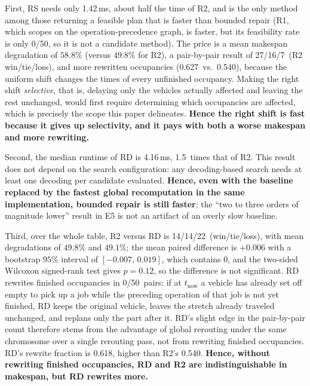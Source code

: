 \documentclass[manuscript,screen,review]{acmart}
\newcommand{\NPairs}{50}
\newcommand{\FeasRone}{0/\NPairs}            %
\newcommand{\MsShift}{1.42}          %
\newcommand{\MsRedecode}{4.16}       %
\newcommand{\RedecodeRatio}{1.5}     %
\newcommand{\RedecodeBad}{0/\NPairs}
\newcommand{\WinVsShift}{27/16/7}    %
\newcommand{\WinVsRedecode}{14/14/22}
\newcommand{\ResFracCheapRtwo}{0.540}
\newcommand{\ResFracShift}{0.627}
\newcommand{\ResFracRedecode}{0.618}
\begin{document}
First, RS needs only \MsShift\,ms, about half the time of R2, and is the only method among those returning a feasible plan that is faster than bounded repair
(R1, which scopes on the operation-precedence graph, is faster, but its feasibility rate is only \FeasRone, so it is not a candidate method).
The price is a mean makespan degradation of \(58.8\%\) (versus \(49.8\%\) for R2), a pair-by-pair result of \WinVsShift\ (R2 win/tie/loss), and more rewritten occupancies
(\ResFracShift\ vs.\ \ResFracCheapRtwo), because the uniform shift changes the times of every unfinished occupancy.
Making the right shift \emph{selective}, that is, delaying only the vehicles actually affected and leaving the rest unchanged, would first require
determining which occupancies are affected, which is precisely the scope this paper delineates.
\textbf{Hence the right shift is fast because it gives up selectivity, and it pays with both a worse makespan and more rewriting.}

Second, the median runtime of RD is \MsRedecode\,ms, \RedecodeRatio\ times that of R2. This result does not depend on the search configuration: any decoding-based search
needs at least one decoding per candidate evaluated.
\textbf{Hence, even with the baseline replaced by the fastest global recomputation in the same implementation, bounded repair is still faster};
the ``two to three orders of magnitude lower'' result in E5 is not an artifact of an overly slow baseline.

Third, over the whole table, R2 versus RD is \WinVsRedecode\ (win/tie/loss), with mean degradations of \(49.8\%\) and \(49.1\%\);
the mean paired difference is \(+0.006\) with a bootstrap \(95\%\) interval of \([-0.007,\,0.019]\), which contains \(0\), and the two-sided Wilcoxon signed-rank test gives \(p=0.12\), so the difference is not significant.
RD rewrites finished occupancies in \RedecodeBad\ pairs: if at \(t_{\mathrm{now}}\) a vehicle has already set off empty to pick up a job while the preceding operation of that job is not yet finished,
RD keeps the original vehicle, leaves the stretch already traveled unchanged, and replans only the part after it. RD's slight edge in the pair-by-pair count therefore stems from the advantage of global rerouting under the same chromosome over a single rerouting pass,
not from rewriting finished occupancies. RD's rewrite fraction is \ResFracRedecode, higher than R2's \ResFracCheapRtwo.
\textbf{Hence, without rewriting finished occupancies, RD and R2 are indistinguishable in makespan, but RD rewrites more.}
\end{document}
